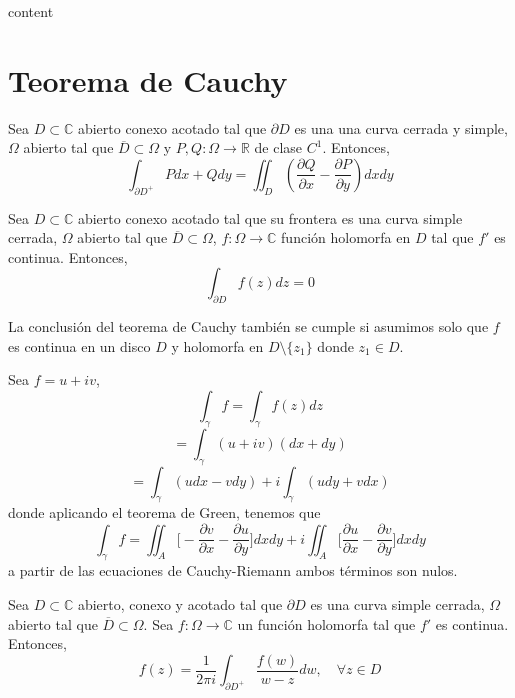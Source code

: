 \begin{dem}
  content
\end{dem}

\section{Teorema de Cauchy}

\begin{defn}
  Sea $D \subset \mathbb{C}$ abierto conexo acotado tal que $\partial D$ es una una curva cerrada y simple, $\Omega$ abierto tal que $\overline{D} \subset \Omega$ y $P,Q: \Omega \to \mathbb{R}$ de clase $C^1$. Entonces,
  \[ 
    \int_{\partial D^+}^{} Pdx + Qdy = \iint_{D}^{} (\frac{\partial{Q}}{\partial{x}} - \frac{\partial{P}}{\partial{y}})dxdy
  \] 
\end{defn}

\begin{theo}[Cauchy]
  Sea $D \subset \mathbb{C}$ abierto conexo acotado tal que su frontera es una curva simple cerrada, $\Omega$ abierto tal que $\overline{D} \subset \Omega$, $f: \Omega \to \mathbb{C}$ función holomorfa en $D$ tal que $f'$ es continua. Entonces,
  \[ 
    \int_{\partial D }^{} f(z) dz = 0
  \] 
\end{theo}

\begin{obs}
  La conclusión del teorema de Cauchy también se cumple si asumimos solo que $f$ es continua en un disco $D$ y holomorfa en $D \setminus \{ z_{1} \}$ donde $z_{1} \in D$.
\end{obs}

\begin{dem}
  Sea $ f = u + i v $,
  \[ 
    \int_{\gamma}^{} f = \int_{\gamma}^{} f(z) dz 
  \] 
  \[ 
    = \int_{\gamma}^{} (u + i v)(dx + dy) 
  \] 
  \[ 
    = \int_{\gamma}^{} (u dx - v dy) + i \int_{\gamma}^{} (u dy + v dx)
  \] 
  donde aplicando el teorema de Green, tenemos que
  \[ 
    \int_{\gamma}^{} f = \iint_{A}^{} \Bigg[ - \frac{\partial{v}}{\partial{x}} - \frac{\partial{u}}{\partial{y}} \Bigg] dxdy + i \iint_{A}^{} \Bigg[ \frac{\partial{u}}{\partial{x}} - \frac{\partial{v}}{\partial{y}} \Bigg] dx dy
  \] 
  a partir de las ecuaciones de Cauchy-Riemann ambos términos son nulos.
\end{dem}

\begin{theo}
  Sea $D \subset \mathbb{C}$ abierto, conexo y acotado tal que $\partial D$ es una curva simple cerrada, $\Omega$ abierto tal que $\overline{D} \subset \Omega$. Sea $f: \Omega \to \mathbb{C}$ un función holomorfa tal que $f'$ es continua. Entonces,
  \[ 
    f(z) = \frac{1}{2 \pi i} \int_{\partial D^+}^{} \frac{f(w)}{w - z} dw, \quad \forall z \in D 
  \] 
\end{theo}

